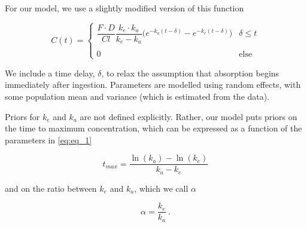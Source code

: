 For our model, we use a slightly modified version of this function

\begin{equation} \label{eq:eq_1}
C(t) =  \begin{cases}  \dfrac{F \cdot D}{\mathit{Cl}} \dfrac{k_e \cdot k_a}{k_e - k_a}\Bigg( e^{-k_a (t-\delta)} - e^{-k_e(t-\delta)} \Bigg)  & \delta \leq t\\\\ 0 & \mbox{else} \end{cases}
\end{equation}

\noindent We include a time delay, $\delta$, to relax the assumption that absorption begins immediately after ingestion.  Parameters are modelled using random effects, with some population mean and variance (which is estimated from the data). 

Priors for $k_e$ and $k_a$ are not defined explicitly.  Rather, our model puts priors on the time to maximum concentration, which can be expressed as a function of the parameters in \cref{eq:eq_1}

\begin{equation}\label{eq:eq_2}
 t_{\mathit{max}} = \dfrac{\ln(k_a) - \ln(k_e)}{k_a - k_e}
\end{equation}

\noindent and on the ratio between $k_e$ and $k_a$, which we call $\alpha$

\begin{equation}\label{eq:eq_3}
\alpha  = \dfrac{k_e}{k_a} \>.
\end{equation}

